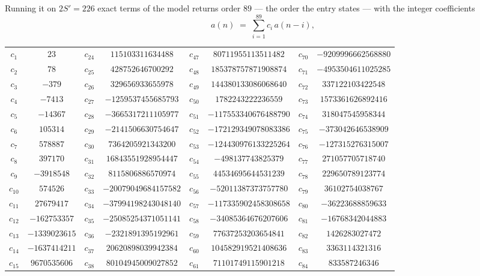 \documentclass[11pt,a4paper]{article}
\theoremstyle{plain}
\theoremstyle{definition}
\begin{document}
Running it on $2S'=226$ exact terms of the model returns order $89$ --- the order the
entry states --- with the integer coefficients
\[
a(n)\;=\;\sum_{i=1}^{89}c_i\,a(n-i),
\]
\begin{center}\small
\begin{tabular}{cccccccc}
$c_{1}$ & $23$ & $c_{24}$ & $115103311634488$ & $c_{47}$ & $80711955113511482$ & $c_{70}$ & $-9209996662568880$ \\
$c_{2}$ & $78$ & $c_{25}$ & $428752646700292$ & $c_{48}$ & $185378757871908874$ & $c_{71}$ & $-4953504611025285$ \\
$c_{3}$ & $-379$ & $c_{26}$ & $329656933655978$ & $c_{49}$ & $144380133086068640$ & $c_{72}$ & $337122103422548$ \\
$c_{4}$ & $-7413$ & $c_{27}$ & $-1259537455685793$ & $c_{50}$ & $1782243222236559$ & $c_{73}$ & $1573361626892416$ \\
$c_{5}$ & $-14367$ & $c_{28}$ & $-3665317211105977$ & $c_{51}$ & $-117553340676488790$ & $c_{74}$ & $318047545958344$ \\
$c_{6}$ & $105314$ & $c_{29}$ & $-2141506630754647$ & $c_{52}$ & $-172129349078083386$ & $c_{75}$ & $-373042646538909$ \\
$c_{7}$ & $578887$ & $c_{30}$ & $7364205921343200$ & $c_{53}$ & $-124430976133225264$ & $c_{76}$ & $-127315276315007$ \\
$c_{8}$ & $397170$ & $c_{31}$ & $16843551928954447$ & $c_{54}$ & $-498137743825379$ & $c_{77}$ & $271057705718740$ \\
$c_{9}$ & $-3918548$ & $c_{32}$ & $8115806886570974$ & $c_{55}$ & $44534695644531239$ & $c_{78}$ & $229650789123774$ \\
$c_{10}$ & $574526$ & $c_{33}$ & $-20079049684157582$ & $c_{56}$ & $-52011387373757780$ & $c_{79}$ & $36102754038767$ \\
$c_{11}$ & $27679417$ & $c_{34}$ & $-37994198243048140$ & $c_{57}$ & $-117335902458308658$ & $c_{80}$ & $-36223688859633$ \\
$c_{12}$ & $-162753357$ & $c_{35}$ & $-25085254371051141$ & $c_{58}$ & $-34085364676207606$ & $c_{81}$ & $-16768342044883$ \\
$c_{13}$ & $-1339023615$ & $c_{36}$ & $-2321891395192961$ & $c_{59}$ & $77637253203654841$ & $c_{82}$ & $1426283027472$ \\
$c_{14}$ & $-1637414211$ & $c_{37}$ & $20620898039942384$ & $c_{60}$ & $104582919521408636$ & $c_{83}$ & $3363114321316$ \\
$c_{15}$ & $9670535606$ & $c_{38}$ & $80104945009027852$ & $c_{61}$ & $71101749115901218$ & $c_{84}$ & $833587246346$ \\

\end{tabular}
\end{center}
\end{document}
